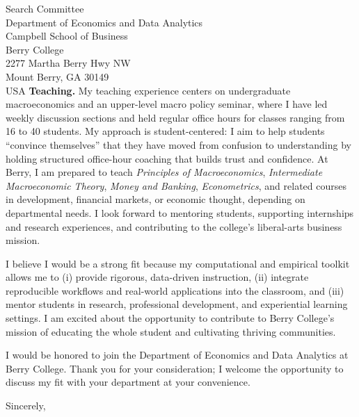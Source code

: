 \documentclass[11pt,letterpaper]{letter}
\begin{document}
\begin{letter}{Search Committee \\
Department of Economics and Data Analytics \\
Campbell School of Business \\
Berry College \\
2277 Martha Berry Hwy NW \\
Mount Berry, GA 30149 \\ USA}
\textbf{Teaching.} My teaching experience centers on undergraduate macroeconomics and an upper-level macro policy seminar, where I have led weekly discussion sections and held regular office hours for classes ranging from 16 to 40 students. My approach is student-centered: I aim to help students “convince themselves” that they have moved from confusion to understanding by holding structured office-hour coaching that builds trust and confidence. At Berry, I am prepared to teach \textit{Principles of Macroeconomics}, \textit{Intermediate Macroeconomic Theory}, \textit{Money and Banking}, \textit{Econometrics}, and related courses in development, financial markets, or economic thought, depending on departmental needs. I look forward to mentoring students, supporting internships and research experiences, and contributing to the college’s liberal-arts business mission.

I believe I would be a strong fit because my computational and empirical toolkit allows me to (i) provide rigorous, data-driven instruction, (ii) integrate reproducible workflows and real-world applications into the classroom, and (iii) mentor students in research, professional development, and experiential learning settings. I am excited about the opportunity to contribute to Berry College’s mission of educating the whole student and cultivating thriving communities.

I would be honored to join the Department of Economics and Data Analytics at Berry College. Thank you for your consideration; I welcome the opportunity to discuss my fit with your department at your convenience.

\closing{Sincerely,}

\end{letter}
\end{document}
